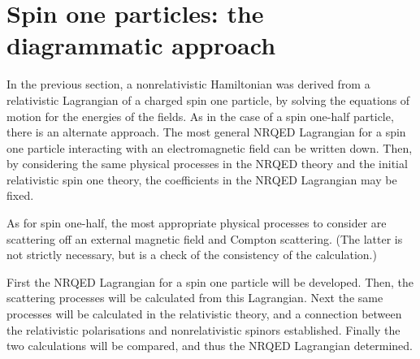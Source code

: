 %  


% 
% 
% 
% 
% 
\chapter{Spin one particles: the diagrammatic approach}


In the previous section, a nonrelativistic Hamiltonian was derived from a relativistic Lagrangian of a charged spin one particle, by solving the equations of motion for the energies of the fields.  As in the case of a spin one-half particle, there is an alternate approach.  The most general NRQED Lagrangian for a spin one particle interacting with an electromagnetic field can be written down.  Then, by considering the same physical processes in the NRQED theory and the initial relativistic spin one theory, the coefficients in the NRQED Lagrangian may be fixed.

As for spin one-half, the most appropriate physical processes to consider are scattering off an external magnetic field and Compton scattering.  (The latter is not strictly necessary, but is a check of the consistency of the calculation.)

First the NRQED Lagrangian for a spin one particle will be developed.  Then, the scattering processes will be calculated from this Lagrangian.  Next the same processes will be calculated in the relativistic theory, and a connection between the relativistic polarisations and nonrelativistic spinors established.  Finally the two calculations will be compared, and thus the NRQED Lagrangian determined.  

